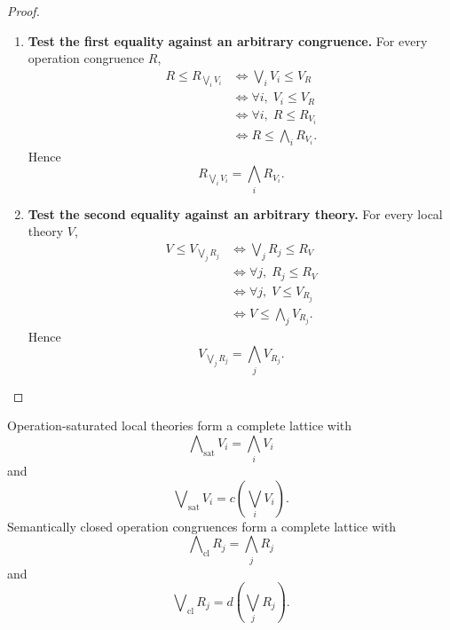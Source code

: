 \begin{proof}
    \leavevmode
    \begin{enumerate}
        \item \textbf{Test the first equality against an arbitrary congruence.}
        For every operation congruence \(R\),
        \[
        \begin{aligned}
            R\leq R_{\bigvee_iV_i}
            &\Longleftrightarrow
            \bigvee_iV_i\leq V_R
            \\
            &\Longleftrightarrow
            \forall i,\;V_i\leq V_R
            \\
            &\Longleftrightarrow
            \forall i,\;R\leq R_{V_i}
            \\
            &\Longleftrightarrow
            R\leq\bigwedge_iR_{V_i}.
        \end{aligned}
        \]
        Hence
        \[
            R_{\bigvee_iV_i}
            =
            \bigwedge_iR_{V_i}.
        \]

        \item \textbf{Test the second equality against an arbitrary theory.}
        For every local theory \(V\),
        \[
        \begin{aligned}
            V\leq V_{\bigvee_jR_j}
            &\Longleftrightarrow
            \bigvee_jR_j\leq R_V
            \\
            &\Longleftrightarrow
            \forall j,\;R_j\leq R_V
            \\
            &\Longleftrightarrow
            \forall j,\;V\leq V_{R_j}
            \\
            &\Longleftrightarrow
            V\leq\bigwedge_jV_{R_j}.
        \end{aligned}
        \]
        Hence
        \[
            V_{\bigvee_jR_j}
            =
            \bigwedge_jV_{R_j}.
        \]
    \end{enumerate}
\end{proof}

\begin{corollary}
\label{cor:to-fixed-point-lattices}
    Operation-saturated local theories form a complete lattice with
    \[
        \bigwedge\nolimits_{\mathrm{sat}}V_i
        =
        \bigwedge_iV_i
    \]
    and
    \[
        \bigvee\nolimits_{\mathrm{sat}}V_i
        =
        c\left(\bigvee_iV_i\right).
    \]
    Semantically closed operation congruences form a complete lattice with
    \[
        \bigwedge\nolimits_{\mathrm{cl}}R_j
        =
        \bigwedge_jR_j
    \]
    and
    \[
        \bigvee\nolimits_{\mathrm{cl}}R_j
        =
        d\left(\bigvee_jR_j\right).
    \]
\end{corollary}

